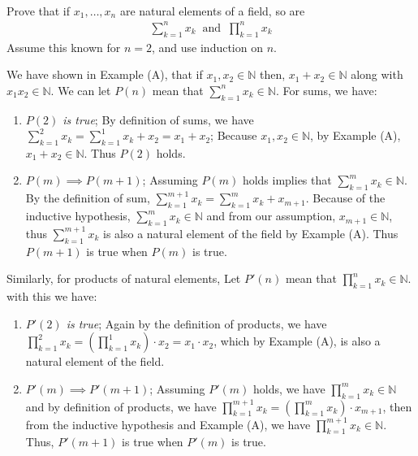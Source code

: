 \documentclass[12pt]{book}
\newcommand{\N}{\mathbb{N}}
\theoremstyle{definition}
\begin{document}
\begin{ex}[2] 
\\
Prove that if $x_1,\ldots, x_n$ are natural elements of a field, so are
\begin{align*}
	\sum_{k=1}^n x_k \;\; \text{and}\;\; \prod_{k=1}^{n}x_k
\end{align*}	
Assume this known for $n=2$, and use induction on $n$. 
\end{ex}
\begin{sol} We have shown in Example (A), that if $x_1,x_2 \in \N$ then, $x_1+x_2 \in \N$ along with $x_1x_2 \in \N$. We can let $P(n)$ mean that $\sum_{k=1}^n x_k \in \N$. For sums, we have:
\begin{enumerate}[label = (\roman*)]
	\item 	\textit{$P(2)$ is true}; By definition of sums, we have $\sum_{k=1}^2 x_k = \sum_{k=1}^1x_k+x_2= x_1+x_2$; Because $x_1, x_2 \in \N$, by Example (A), $x_1+x_2 \in \N$. Thus $P(2)$ holds.
	\item  $P(m)\implies P(m+1)$; Assuming $P(m)$ holds implies that $\sum_{k=1}^m x_k \in \N$. By the definition of sum, $\sum_{k=1}^{m+1} x_k = \sum_{k=1}^m x_k +x_{m+1}$. Because of the inductive hypothesis, $\sum_{k=1}^m x_k \in \N$ and from our assumption, $x_{m+1} \in \N$, thus $\sum_{k=1}^{m+1} x_k$ is also a natural element of the field by Example (A). Thus $P(m+1)$ is true when $P(m)$ is true.
\end{enumerate}
Similarly, for products of natural elements, Let $P'(n)$ mean that $\prod_{k=1}^{n}x_k \in \N$. with this we have:
\begin{enumerate}[label = (\roman*)$'$]
 \item 	\textit{$P'(2)$ is true}; Again by the definition of products, we have $\prod_{k=1}^2 x_k = (\prod_{k=1}^1x_k) \cdot x_2 = x_1\cdot x_2$, which by Example (A), is also a natural element of the field.
 \item  $P'(m)\implies P'(m+1)$; Assuming $P'(m)$ holds, we have $\prod_{k=1}^{m}x_k \in \N$ and by definition of products, we have $\prod_{k=1}^{m+1}x_k = (\prod_{k=1}^{m}x_k )\cdot x_{m+1}$, then from the inductive hypothesis and Example (A), we have $\prod_{k=1}^{m+1}x_k \in \N$. Thus, $P'(m+1)$ is true when $P'(m)$ is true. 
\end{enumerate}

	
\end{sol}
\end{document}
